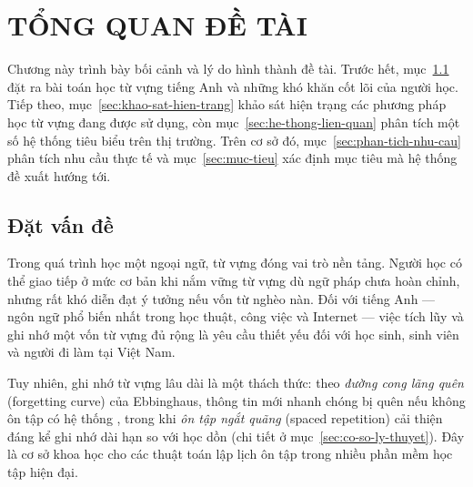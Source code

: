 %
%      
%

\chapter{TỔNG QUAN ĐỀ TÀI}
\label{chuong:tong-quan}

Chương này trình bày bối cảnh và lý do hình thành đề tài. Trước hết,
mục~\ref{sec:dat-van-de} đặt ra bài toán học từ vựng tiếng Anh và những
khó khăn cốt lõi của người học. Tiếp theo, mục~\ref{sec:khao-sat-hien-trang}
khảo sát hiện trạng các phương pháp học từ vựng đang được sử dụng, còn
mục~\ref{sec:he-thong-lien-quan} phân tích một số hệ thống tiêu biểu trên
thị trường. Trên cơ sở đó, mục~\ref{sec:phan-tich-nhu-cau} phân tích nhu
cầu thực tế và mục~\ref{sec:muc-tieu} xác định mục tiêu mà hệ thống đề xuất
hướng tới.

\section{Đặt vấn đề}
\label{sec:dat-van-de}

Trong quá trình học một ngoại ngữ, từ vựng đóng vai trò nền tảng. Người
học có thể giao tiếp ở mức cơ bản khi nắm vững từ vựng dù ngữ pháp chưa
hoàn chỉnh, nhưng rất khó diễn đạt ý tưởng nếu vốn từ nghèo nàn. Đối với
tiếng Anh — ngôn ngữ phổ biến nhất trong học thuật, công việc và Internet
— việc tích lũy và ghi nhớ một vốn từ vựng đủ rộng là yêu cầu thiết yếu
đối với học sinh, sinh viên và người đi làm tại Việt Nam.

Tuy nhiên, ghi nhớ từ vựng lâu dài là một thách thức: theo \textit{đường
cong lãng quên} (forgetting curve) của Ebbinghaus, thông tin mới nhanh chóng
bị quên nếu không ôn tập có hệ thống \cite{ebbinghaus1913memory}, trong khi
\textit{ôn tập ngắt quãng} (spaced repetition) cải thiện đáng kể ghi nhớ dài
hạn so với học dồn \cite{cepeda2006distributed} (chi tiết ở
mục~\ref{sec:co-so-ly-thuyet}). Đây là cơ sở khoa học cho các thuật toán lập
lịch ôn tập trong nhiều phần mềm học tập hiện đại.

